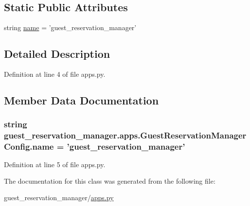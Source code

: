\subsection*{Static Public Attributes}
\begin{DoxyCompactItemize}
\item 
string \hyperlink{classguest__reservation__manager_1_1apps_1_1GuestReservationManagerConfig_a2bf2b500906a4a593a7f11c00b940590}{name} = 'guest\-\_\-reservation\-\_\-manager'
\end{DoxyCompactItemize}


\subsection{Detailed Description}


Definition at line 4 of file apps.\-py.



\subsection{Member Data Documentation}
\hypertarget{classguest__reservation__manager_1_1apps_1_1GuestReservationManagerConfig_a2bf2b500906a4a593a7f11c00b940590}{
\subsubsection[{name}]{\setlength{\rightskip}{0pt plus 5cm}string guest\-\_\-reservation\-\_\-manager.\-apps.\-Guest\-Reservation\-Manager\-Config.\-name = 'guest\-\_\-reservation\-\_\-manager'\hspace{0.3cm}{\ttfamily [static]}}}\label{classguest__reservation__manager_1_1apps_1_1GuestReservationManagerConfig_a2bf2b500906a4a593a7f11c00b940590}


Definition at line 5 of file apps.\-py.



The documentation for this class was generated from the following file\-:\begin{DoxyCompactItemize}
\item 
guest\-\_\-reservation\-\_\-manager/\hyperlink{guest__reservation__manager_2apps_8py}{apps.\-py}\end{DoxyCompactItemize}
